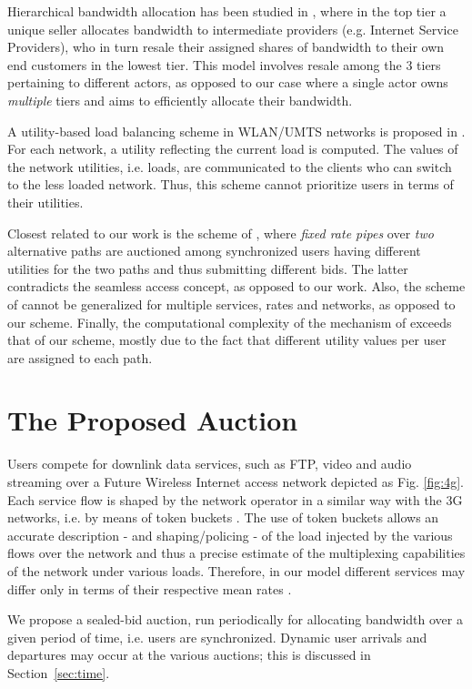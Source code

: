\documentclass[a4paper]{article}
\begin{document}
Hierarchical
bandwidth allocation has been studied in \cite{marina}, where in the top tier 
a unique seller allocates bandwidth to intermediate providers (e.g. Internet 
Service Providers), who in turn resale their assigned shares of bandwidth to 
their own end customers in the lowest tier. This model involves
resale among the 3 tiers pertaining to different actors, as opposed to
our case where a single actor owns {\em multiple} tiers and aims to efficiently 
allocate their bandwidth.

A utility-based load balancing scheme in WLAN/UMTS networks is proposed in \cite{umts}. 
For each network, a utility reflecting the current load is computed. The values
of the network utilities, i.e. loads, are communicated to the clients who can switch to
the less loaded  network. Thus, this scheme cannot prioritize users in terms of their
utilities. 

Closest related to our work is the scheme of \cite{gds}, where {\em fixed rate pipes}
over {\em two} alternative paths are auctioned among synchronized users having different 
utilities for the two paths and thus submitting different bids. The latter
contradicts the seamless access concept, as opposed to our work.
Also, the scheme of \cite{gds} cannot be generalized 
for multiple services, rates and networks, as opposed to our scheme.
Finally, the computational complexity of the mechanism of \cite{gds} exceeds 
that of our scheme, mostly due to the fact that different utility values per user
are assigned to each path. 

\section{The Proposed Auction}\label{sec:auc}

Users compete for downlink data services, such as FTP, 
video and audio streaming over a Future Wireless Internet access network 
depicted as Fig. \ref{fig:4g}. 
Each service flow is shaped by the network operator
in a similar way with the 3G networks, i.e. by means of token buckets 
\cite{3gpp}. The use of token buckets allows an accurate description - and
shaping/policing - of the load injected by the various flows over the network and
thus a precise estimate of the multiplexing capabilities of the network
under various loads. 
Therefore, in our model different services  may
differ only in terms of their respective mean rates . 

We propose a sealed-bid auction, run 
periodically for allocating bandwidth over a given period of time, i.e. users
are synchronized. Dynamic user arrivals and departures may occur at the various 
auctions; this is discussed in Section~\ref{sec:time}. 
\end{document}
